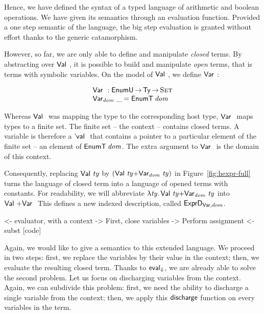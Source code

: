 Hence, we have defined the syntax of a typed language of arithmetic
and boolean operations. We have given its semantics through an
evaluation function. Provided a one step semantic of the language, the
big step evaluation is granted without effort thanks to the generic
catamorphism. 

However, so far, we are only able to define and manipulate
\emph{closed} terms. By abstracting over $\Val{}$, it is possible to
build and manipulate \emph{open} terms, that is terms with symbolic
variables. On the model of $\Val{}$, we define $\Var{}{}$:

\[\stk{
\Var{}{} : \EnumU \To \Ty \To \Set \\
\Var{\V{dom}}{\_} = \EnumT{\V{dom}}
}\]

Whereas $\Val{}$ was mapping the type to the corresponding host type,
$\Var{}{}$ maps types to a finite set. The finite set -- the context
-- contains closed terms. A variable is therefore a $\Eval{}$ that
contains a pointer to a particular element of the finite set -- an
element of $\EnumT{\V{dom}}$. The extra argument to $\Var{}{}$ is the
domain of this context.

Consequently, replacing $\Val{\V{ty}}$ by
$(\SUM{\Val{\V{ty}}}{\Var{\V{dom}}{\V{ty}}})$ in Figure~\ref{fig:hexpr-full} turns
the language of closed term into a language of opened terms with
constants. For readability, we will abbreviate $\LAM{\V{ty}}
\SUM{\Val{\V{ty}}}{\Var{\V{dom}}{\V{ty}}}$ into $\SUM{\Val{}}{\Var{}{}}$  This defines a new
indexed description, called $\HExprVarD{dom}$.

\begin{wstructure}
        <- evaluator, with a context
            -> First, close variables
                -> Perform assignment
                <- subst [code]
\end{wstructure}

\newcommand{\discharge}{\F{discharge}}

Again, we would like to give a semantics to this extended language. We
proceed in two steps: first, we replace the variables by their value
in the context; then, we evaluate the resulting closed term. Thanks to
$\evalH$, we are already able to solve the second problem. Let us
focus on discharging variables from the context. Again, we can
subdivide this problem: first, we need the ability to discharge a
single variable from the context; then, we apply this $\discharge$
function on every variables in the term.

